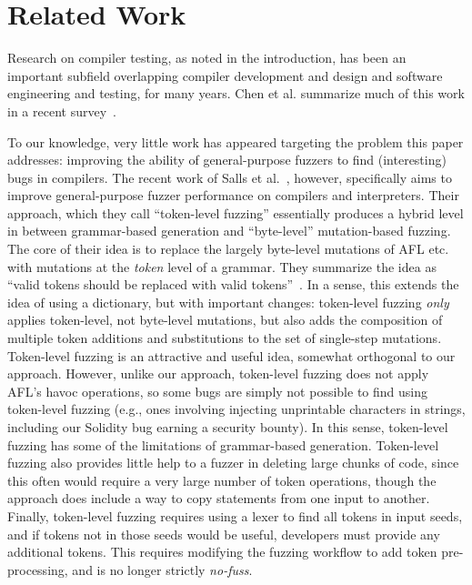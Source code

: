 \section{Related Work}

Research on compiler testing, as noted in the introduction, has been an important subfield overlapping compiler development and design and software engineering and testing, for many years.  Chen et al. summarize much of this work in a recent survey~\cite{chen2020survey}.

To our knowledge, very little work has appeared targeting the problem this paper addresses: improving the ability of general-purpose fuzzers to find (interesting) bugs in compilers.  The recent work of Salls et al.~\cite{Salls2021TokenLevel}, however, specifically aims to improve general-purpose fuzzer performance on compilers and interpreters.  Their approach, which they call ``token-level fuzzing'' essentially produces a hybrid level in between grammar-based generation and ``byte-level'' mutation-based fuzzing.  The core of their idea is to replace the largely byte-level mutations of AFL etc. with mutations at the \emph{token} level of a grammar.  They summarize the idea as ``valid tokens should be replaced with valid tokens''~\cite{Salls2021TokenLevel}.  In a sense, this extends the idea of using a dictionary, but with important changes:  token-level fuzzing \emph{only} applies token-level, not byte-level mutations, but also adds the composition of multiple token additions and substitutions to the set of single-step mutations.  Token-level fuzzing is an attractive and useful idea, somewhat orthogonal to our approach.  However, unlike our approach, token-level fuzzing does not apply AFL's havoc operations, so some bugs are simply not possible to find using token-level fuzzing (e.g., ones involving injecting unprintable characters in strings, including our Solidity bug earning a security bounty).  In this sense, token-level fuzzing has some of the limitations of grammar-based generation.  Token-level fuzzing also provides little help to a fuzzer in deleting large chunks of code, since this often would require a very large number of token operations, though the approach does include a way to copy statements from one input to another.  Finally, token-level fuzzing requires using a lexer to find all tokens in input seeds, and if tokens not in those seeds would be useful, developers must provide any additional tokens.  This requires modifying the fuzzing workflow to add token pre-processing, and is no longer strictly \emph{no-fuss}.